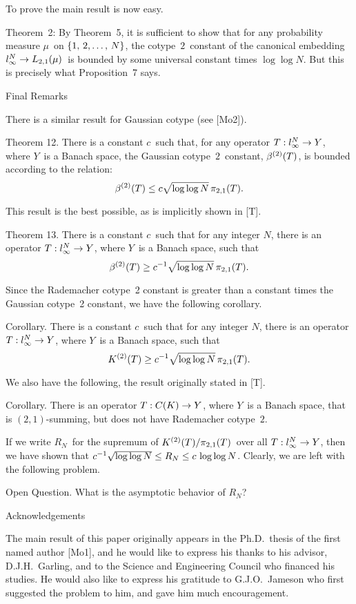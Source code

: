 To prove the main result is now easy.

\Proofof Theorem~2: By Theorem~5, it is sufficient to show that for
any
probability measure $\mu$\ on $\set N$, the cotype~$2$\ constant of
the
canonical embedding ${l_\infty^N} \to L_{2,1}(\mu)$\ is bounded by some
universal
constant times $\log\log N$. But this is precisely what Proposition~7
says.
\endproof

\beginsection Final Remarks

There is a similar result for Gaussian cotype (see [Mo2]).

\proclaim Theorem 12. There is a constant $c$\ such that, for any
operator
$T:{l_\infty^N}\to Y$, where $Y$\ is a Banach space, the
Gaussian cotype~$2$\ constant, $\beta^{(2)}(T)$, is bounded according to the
relation:
$$ \beta^{(2)}(T) \le c \sqrt{\log\log N} \, \pi_{2,1}(T) .$$

This result is the best possible, as is implicitly shown in [T].

\proclaim Theorem 13. There is a constant $c$\ such that for any
integer $N$,
there is an operator $T:{l_\infty^N}\to Y$, where $Y$\ is a Banach space, such that
$$ \beta^{(2)}(T) \ge {c^{-1}} \sqrt{\log\log N} \, \pi_{2,1}(T) .$$

Since the Rademacher cotype~2 constant is greater than a constant
times the
Gaussian cotype~2 constant, we have the following corollary.

\proclaim Corollary. There is a constant $c$\ such that for any
integer $N$,
there is an operator $T:{l_\infty^N}\to Y$, where $Y$\ is a Banach space, such that
$$ K^{(2)}(T) \ge {c^{-1}} \sqrt{\log\log N} \, \pi_{2,1}(T) .$$

We also have the following, the result originally stated in [T].

\proclaim Corollary. There is an operator $T:C(K)\to Y$, where $Y$\ is a
Banach
space, that is $(2,1)$-summing, but does not have Rademacher cotype~$2$.

If we write $R_N$\ for the supremum of $K^{(2)}(T) / \pi_{2,1}(T)$\ over all
$T:{l_\infty^N}\to Y$, then
we have shown that ${c^{-1}} \sqrt{\log\log N} \le R_N \le c \, \log\log
N$.
Clearly, we are left with the following problem.

\proclaim Open Question. What is the asymptotic behavior of $R_N$?

\beginsection Acknowledgements

The main result of this paper originally appears in the Ph.D.\ thesis
of the
first named author [Mo1], and he would like to express his
thanks to his advisor, D.J.H.~Garling, and to the Science and
Engineering
Council who financed his studies. He would also like to express his
gratitude to G.J.O.~Jameson who first suggested the problem to him,
and gave him
much encouragement.

